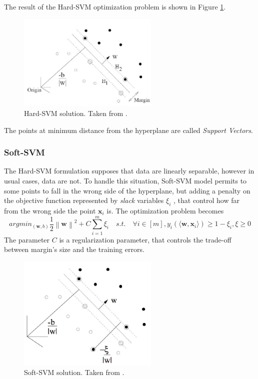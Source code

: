 The result of the Hard-\ac{SVM} optimization problem is shown in Figure \ref{fig:hard-svm}.

\begin{figure}[ht]
	\centering
	\includegraphics[width=0.6\textwidth]{figures/hard-svm.jpg}
	\caption{Hard-SVM solution. Taken from \cite{Pinault2015ModellingWK}.}
	\label{fig:hard-svm}
\end{figure}

The points at minimum distance from the hyperplane are called \textit{Support Vectors}.

\subsubsection{Soft-SVM}

The Hard-\ac{SVM} formulation supposes that data are linearly separable, however in usual cases, data are not. To handle this situation, Soft-\ac{SVM} model permits to some points to fall in the wrong side of the hyperplane, but adding a penalty on the objective function represented by \textit{slack} variables $\xi _i$ , that control how far from the wrong side the point $\mathbf{x}_i$ is. The optimization problem becomes
\[ argmin_{(\mathbf{w}, b)} \frac{1}{2} \left\lVert \mathbf{w} \right\rVert ^2 + C \sum_{i=1}^{m} \xi_i \quad s.t. \quad \forall i \in [m], y_i (\langle \mathbf{w}, \mathbf{x}_i \rangle) \ge 1 - \xi_i , \xi \ge 0  \]
The parameter $C$ is a regularization parameter, that controls the trade-off between margin's size and the training errors. 

\begin{figure}[ht]
	\centering
	\includegraphics[width=0.6\textwidth]{figures/soft-svm.jpg}
	\caption{Soft-SVM solution. Taken from \cite{Pinault2015ModellingWK}.}%
	\label{fig:soft-svm}
\end{figure}

